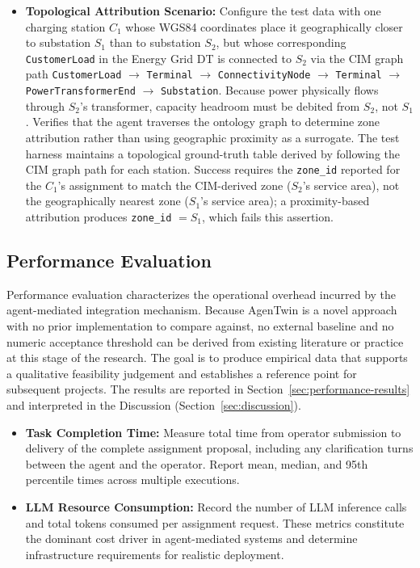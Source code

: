 \begin{itemize}
    \item \textbf{Topological Attribution Scenario:}
    Configure the test data with one charging station $C_1$
        whose WGS84 coordinates place it geographically closer to substation $S_1$
        than to substation $S_2$,
        but whose corresponding \texttt{CustomerLoad} in the Energy Grid DT is
        connected to $S_2$ via the CIM graph path
        \texttt{CustomerLoad} $\to$ \texttt{Terminal} $\to$
        \texttt{ConnectivityNode} $\to$ \texttt{Terminal} $\to$
        \texttt{PowerTransformerEnd} $\to$ \texttt{Substation}.
    Because power physically flows through $S_2$'s transformer,
        capacity headroom must be debited from $S_2$, not $S_1$.
    Verifies that the agent traverses the ontology graph to determine zone attribution
        rather than using geographic proximity as a surrogate.
    The test harness maintains a topological ground-truth table
        derived by following the CIM graph path for each station.
    Success requires the \texttt{zone\_id} reported for the $C_1$'s assignment
        to match the CIM-derived zone ($S_2$'s service area),
        not the geographically nearest zone ($S_1$'s service area);
        a proximity-based attribution produces \texttt{zone\_id} $= S_1$,
        which fails this assertion.
\end{itemize}

\subsection{Performance Evaluation}
\label{subsec:performance-evaluation}

Performance evaluation characterizes the operational overhead incurred by
    the agent-mediated integration mechanism.
Because AgenTwin is a novel approach with no prior implementation to compare against,
    no external baseline and no numeric acceptance threshold can be derived from
    existing literature or practice at this stage of the research.
The goal is to produce empirical data that supports a qualitative feasibility judgement
    and establishes a reference point for subsequent projects.
The results are reported in Section~\ref{sec:performance-results}
    and interpreted in the Discussion (Section~\ref{sec:discussion}).

\begin{itemize}
    \item \textbf{Task Completion Time:} %
    Measure total time from operator submission to delivery of the complete assignment proposal,
        including any clarification turns between the agent and the operator.
    Report mean, median, and 95th percentile times across multiple executions.

    \item \textbf{LLM Resource Consumption:} %
    Record the number of LLM inference calls and total tokens consumed
        per assignment request.
    These metrics constitute the dominant cost driver in agent-mediated systems
        and determine infrastructure requirements for realistic deployment.
\end{itemize}
